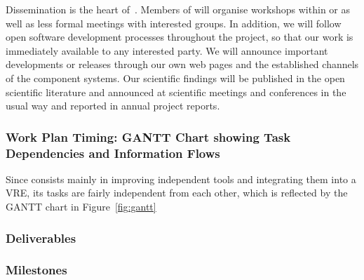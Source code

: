 Dissemination is the heart of~.
Members of \TheProject will organise workshops within 
or  as well as less formal meetings
with interested groups. In addition, we will follow open software development
processes throughout the project, so that our work is immediately
available to any interested party. We will announce important
developments or releases through our own web pages and the
established channels of the component systems. Our scientific findings
will be published in the open scientific literature and announced at
scientific meetings and conferences in the usual way and reported in
annual project reports.


\subsubsection{Work Plan Timing: GANTT Chart showing Task Dependencies and Information
  Flows}

Since \TheProject consists mainly in improving independent tools and
integrating them into a VRE, its tasks are fairly independent from each
other, which is reflected by the GANTT chart in Figure~\ref{fig:gantt}

\gantttaskchart[draft,xscale=.33,yscale=.33,milestones]

\ifgrantagreement\else
\newpage
\subsubsection{Deliverables}\label{sec:deliverables}
\fi

\newpage
\subsubsection{Milestones}\label{sec:milestones}






